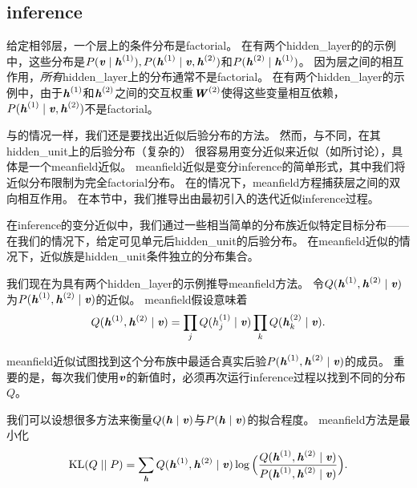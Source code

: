 \subsection{\gls{inference}}
\label{sec:dbm_mean_field_inference}
给定相邻层，一个层上的条件分布是\gls{factorial}。
在有两个\gls{hidden_layer}的的示例中，这些分布是$P(\Vv  \mid  \Vh^{(1)}), P(\Vh^{(1)}  \mid  \Vv, \Vh^{(2)})$和$P(\Vh^{(2)}  \mid  \Vh^{(1)})$。
因为层之间的相互作用，\emph{所有}\gls{hidden_layer}上的分布通常不是\gls{factorial}。
在有两个\gls{hidden_layer}的示例中，由于$\Vh^{(1)}$和$\Vh^{(2)}$之间的交互权重$\MW^{(2)}$使得这些变量相互依赖， $ P(\Vh^{(1)}  \mid  \Vv, \Vh^{(2)})$不是\gls{factorial}。


与的情况一样，我们还是要找出近似后验分布的方法。
然而，与不同，在其\gls{hidden_unit}上的后验分布（复杂的） 很容易用变分近似来近似（如所讨论），具体是一个\gls{meanfield}近似。
\gls{meanfield}近似是变分\gls{inference}的简单形式，其中我们将近似分布限制为完全\gls{factorial}分布。
在的情况下，\gls{meanfield}方程捕获层之间的双向相互作用。
在本节中，我们推导出由\cite{SalHinton09}最初引入的迭代近似\gls{inference}过程。


在\gls{inference}的变分近似中，我们通过一些相当简单的分布族近似特定目标分布——在我们的情况下，给定可见单元后\gls{hidden_unit}的后验分布。
在\gls{meanfield}近似的情况下，近似族是\gls{hidden_unit}条件独立的分布集合。


我们现在为具有两个\gls{hidden_layer}的示例推导\gls{meanfield}方法。
令$Q(\Vh^{(1)}, \Vh^{(2)}  \mid  \Vv)$为$P(\Vh^{(1)}, \Vh^{(2)}  \mid  \Vv)$的近似。
\gls{meanfield}假设意味着
\begin{align}
 Q(\Vh^{(1)}, \Vh^{(2)}  \mid  \Vv) = \prod_j Q(h_j^{(1)} \mid  \Vv) \prod_k Q(\Vh_k^{(2)}  \mid  \Vv).
\end{align}

\gls{meanfield}近似试图找到这个分布族中最适合真实后验$P(\Vh^{(1)}, \Vh^{(2)}  \mid  \Vv)$的成员。
重要的是，每次我们使用$\Vv$的新值时，必须再次运行\gls{inference}过程以找到不同的分布$Q$。


我们可以设想很多方法来衡量$Q(\Vh  \mid  \Vv)$与$P(\Vh  \mid  \Vv)$的拟合程度。
\gls{meanfield}方法是最小化
\begin{align}
 \text{KL}(Q \mid  \mid P) = \sum_{\Vh} Q(\Vh^{(1)}, \Vh^{(2)}  \mid  \Vv) 
 \log \Big( \frac{Q(\Vh^{(1)}, \Vh^{(2)}  \mid  \Vv)}{P(\Vh^{(1)}, \Vh^{(2)}  \mid  \Vv)} \Big).
\end{align}

